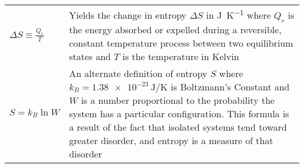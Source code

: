 \begin{longtable}{p{} p{}}
  \(\Delta S\equiv\displaystyle\frac{Q_r}{T}\) & Yields the change in entropy $\Delta S$ in \si{\joule\per\kelvin} where $Q_r$ is the energy absorbed or expelled during a reversible, constant temperature process between two equilibrium states and $T$ is the temperature in Kelvin \\
  \(S = k_B\ln W\) & An alternate definition of entropy $S$ where $k_B=\SI{1.38e-23}{\joule\per\kelvin}$ is Boltzmann's Constant and $W$ is a number proportional to the probability the system has a particular configuration. This formula is a result of the fact that isolated systems tend toward greater disorder, and entropy is a measure of that disorder \\
\end{longtable}
